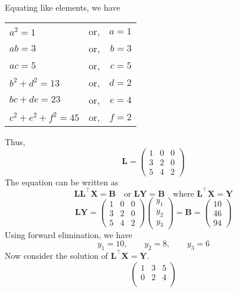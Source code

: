 \documentclass[12pt,class=book,crop=false]{standalone}
\begin{document}
\begin{soln}
\begin{align*}
    \end{align*}
    Equating like elements, we have
    \begin{table}[H]
        \centering
        \begin{tabular}{lcr}
            $ a^2=1 $          & or, & $ a=1 $ \\
            $ ab=3	 $           & or, & $ b=3 $ \\
            $ ac=5 $           & or, & $ c=5 $ \\
            $ b^2+d^2=13 $     & or, & $ d=2 $ \\
            $ bc+de=23 $       & or, & $ e=4 $ \\
            $ c^2+e^2+f^2=45 $ & or, & $ f=2 $
        \end{tabular}
    \end{table}
    Thus,
    \[
        \mathbf{L}=
        \begin{pmatrix}
            1 & 0 & 0 \\
            3 & 2 & 0 \\
            5 & 4 & 2
        \end{pmatrix}
    \]
    The equation can be written as
    \[
        \mathbf{L}\mathbf{L}^\top \mathbf{X}=\mathbf{B}\quad \text{or }   \mathbf{LY}=\mathbf{B}\quad  \text{where }   \mathbf{L}^\top \mathbf{X}=\mathbf{Y}
    \]
    \[
        \mathbf{LY}=
        \begin{pmatrix}
            1 & 0 & 0 \\
            3 & 2 & 0 \\
            5 & 4 & 2
        \end{pmatrix}
        \begin{pmatrix}
            y_1 \\
            y_2 \\
            y_3
        \end{pmatrix}
        =\mathbf{B}=
        \begin{pmatrix}
            10 \\
            46 \\
            94
        \end{pmatrix}
    \]
    Using forward elimination, we have
    \[
        y_1=10,\qquad  y_2=8,\qquad y_3=6
    \]
    Now consider the solution of $ \mathbf{L}^\top \mathbf{X}=\mathbf{Y} $.
    \[
        \begin{pmatrix}
            1 & 3 & 5 \\
            0 & 2 & 4 \\

\end{pmatrix}\]
\end{soln}
\end{document}
